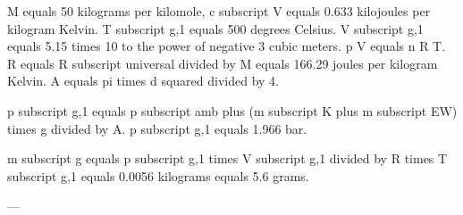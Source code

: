 M equals 50 kilograms per kilomole, c subscript V equals 0.633 kilojoules per kilogram Kelvin.  
T subscript g,1 equals 500 degrees Celsius.  
V subscript g,1 equals 5.15 times 10 to the power of negative 3 cubic meters.  
p V equals n R T.  
R equals R subscript universal divided by M equals 166.29 joules per kilogram Kelvin.  
A equals pi times d squared divided by 4.  

p subscript g,1 equals p subscript amb plus (m subscript K plus m subscript EW) times g divided by A.  
p subscript g,1 equals 1.966 bar.  

m subscript g equals p subscript g,1 times V subscript g,1 divided by R times T subscript g,1 equals 0.0056 kilograms equals 5.6 grams.  

---